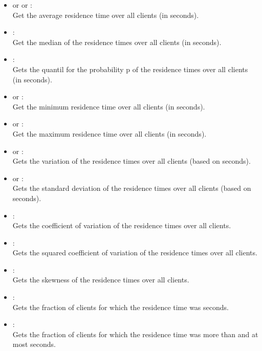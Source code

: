 \begin{itemize}

\item
{} or  or :\\
Get the average residence time over all clients (in seconds).

\item
{}:\\
Get the median of the residence times over all clients (in seconds).

\item
{}:\\
Gets the quantil for the probability p of the residence times over all clients (in seconds).

\item
{} or :\\
Get the minimum residence time over all clients (in seconds).

\item
{} or :\\
Get the maximum residence time over all clients (in seconds).

\item
{} or :\\
Gets the variation of the residence times over all clients (based on seconds).

\item
{} or :\\
Gets the standard deviation of the residence times over all clients (based on seconds).

\item
{}:\\
Gets the coefficient of variation of the residence times over all clients. 

\item
{}:\\
Gets the squared coefficient of variation of the residence times over all clients.

\item
{}:\\
Gets the skewness of the residence times over all clients. 

\item
{}:\\
Gets the fraction of clients for which the residence time was  seconds.

\item
{}:\\
Gets the fraction of clients for which the residence time was more than  and at most  seconds.

\end{itemize}  



